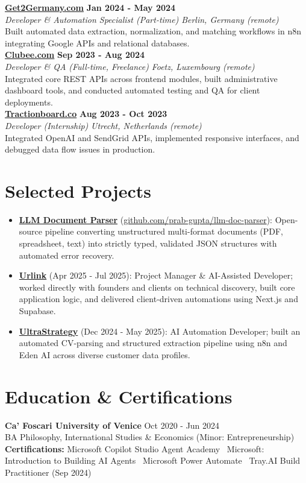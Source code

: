 \documentclass[a4paper,10pt]{article}
\newcommand{\role}[4]{%
 \textbf{#1} \hfill \textbf{#2}\\[1pt]%
 \textit{#3} \hfill \textit{#4}\\[2pt]%
}
\begin{document}
\role{\href{https://get2germany.com}{Get2Germany.com}}{Jan 2024 - May 2024}{Developer \& Automation Specialist (Part-time)}{Berlin, Germany (remote)}
Built automated data extraction, normalization, and matching workflows in n8n integrating Google APIs and relational databases.\\[1pt]

\role{\href{https://clubee.com}{Clubee.com}}{Sep 2023 - Aug 2024}{Developer \& QA (Full-time, Freelance)}{Foetz, Luxembourg (remote)}
Integrated core REST APIs across frontend modules, built administrative dashboard tools, and conducted automated testing and QA for client deployments.\\[1pt]

\role{\href{https://tractionboard.co}{Tractionboard.co}}{Aug 2023 - Oct 2023}{Developer (Internship)}{Utrecht, Netherlands (remote)}
Integrated OpenAI and SendGrid APIs, implemented responsive interfaces, and debugged data flow issues in production.

\section{Selected Projects}
\begin{itemize}
 \item \textbf{\href{https://github.com/prab-gupta/llm-doc-parser}{LLM Document Parser}} (\href{https://github.com/prab-gupta/llm-doc-parser}{github.com/prab-gupta/llm-doc-parser}): Open-source pipeline converting unstructured multi-format documents (PDF, spreadsheet, text) into strictly typed, validated JSON structures with automated error recovery.
 \item \textbf{\href{https://smarturlink.com/}{Urlink}} (Apr 2025 - Jul 2025): Project Manager \& AI-Assisted Developer; worked directly with founders and clients on technical discovery, built core application logic, and delivered client-driven automations using Next.js and Supabase.
 \item \textbf{\href{https://ultrastrategy.com}{UltraStrategy}} (Dec 2024 - May 2025): AI Automation Developer; built an automated CV-parsing and structured extraction pipeline using n8n and Eden AI across diverse customer data profiles.
\end{itemize}

\section{Education \& Certifications}
\textbf{Ca' Foscari University of Venice} \hfill Oct 2020 - Jun 2024\\
BA Philosophy, International Studies \& Economics (Minor: Entrepreneurship)\\[1pt]
\textbf{Certifications:} Microsoft Copilot Studio Agent Academy \textbullet\ Microsoft: Introduction to Building AI Agents \textbullet\ Microsoft Power Automate \textbullet\ Tray.AI Build Practitioner (Sep 2024)
\end{document}
